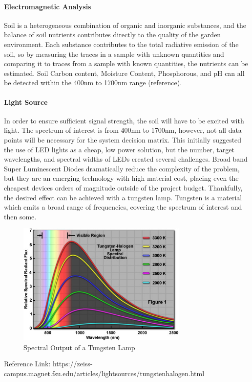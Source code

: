 \paragraph{Electromagnetic Analysis} Soil is a heterogeneous combination of organic and inorganic substances, and the balance of soil nutrients contributes directly to the quality of the garden environment. Each substance contributes to the total radiative emission of the soil, so by measuring the traces in a sample with unknown quantities and comparing it to traces from a sample with known quantities, the nutrients can be estimated. Soil Carbon content, Moisture Content, Phosphorous, and pH can all be detected within the 400nm to 1700nm range (reference).

\paragraph{Light Source} In order to ensure sufficient signal strength, the soil will have to be excited with light. The spectrum of interest is from 400nm to 1700nm, however, not all data points will be necessary for the system decision matrix. This initially suggested the use of LED lights as a cheap, low power solution, but the number, target wavelengths, and spectral widths of LEDs created several challenges. Broad band Super Luminescent Diodes dramatically reduce the complexity of the problem, but they are an emerging technology with high material cost, placing even the cheapest devices orders of magnitude outside of the project budget. Thankfully, the desired effect can be achieved with a tungsten lamp. Tungsten is a material which emits a broad range of frequencies, covering the spectrum of interest and then some.

\begin{figure}[H]
    \caption{Spectral Output of a Tungsten Lamp}
    \centering
    \includegraphics[width=0.75\textwidth]{images/TungstenLamp.jpg}
\end{figure}
Reference Link: https://zeiss-campus.magnet.fsu.edu/articles/lightsources/tungstenhalogen.html

